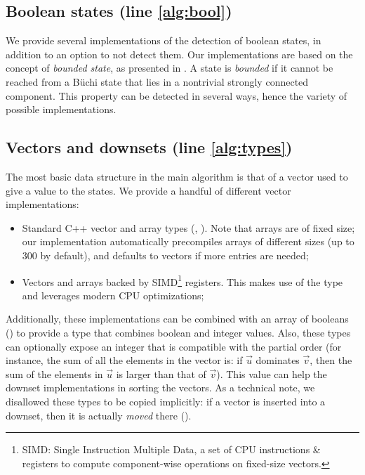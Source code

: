 \documentclass[sigconf,screen,nonacm]{acmart}
\begin{document}
\subsection{Boolean states (line \ref{alg:bool})}

We provide several implementations of the detection of boolean states, in
addition to an option to not detect them.  Our implementations are based on the
concept of \emph{bounded state}, as presented in \cite{...}.  A state is
\emph{bounded} if it cannot be reached from a Büchi state that lies in a
nontrivial strongly connected component.  This property can be detected in
several ways, hence the variety of possible implementations.

\subsection{Vectors and downsets (line \ref{alg:types})}

The most basic data structure in the main algorithm is that of a vector used to
give a value to the states.  We provide a handful of different vector
implementations:
\begin{itemize}
\item Standard C++ vector and array types (,\linebreak
  ).  Note that arrays are of fixed size; our implementation
  automatically precompiles arrays of different sizes (up to \(300\) by default),
  and defaults to vectors if more entries are needed;
\item Vectors and arrays backed by SIMD\footnote{SIMD: Single Instruction
    Multiple Data, a set of CPU instructions \& registers to compute
    component-wise operations on fixed-size vectors.} registers.  This makes use of the
   type and leverages modern CPU optimizations;
\end{itemize}

Additionally, these implementations can be combined with an array of booleans
() to provide a type that combines boolean and integer
values.  Also, these types can optionally expose an integer that is compatible
with the partial order (for instance, the sum of all the elements in the vector
is: if \(\vec{u}\) dominates \(\vec{v}\), then the sum of the elements in \(\vec{u}\)
is larger than that of \(\vec{v}\)).  This value can help the downset
implementations in sorting the vectors.  As a technical note, we disallowed
these types to be copied implicitly: if a vector is inserted into a downset,
then it is actually \emph{moved} there ().
\end{document}
